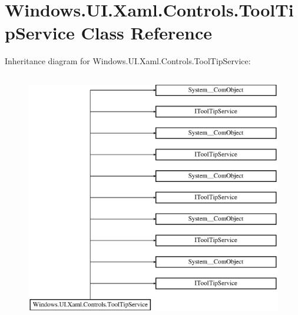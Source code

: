 \hypertarget{class_windows_1_1_u_i_1_1_xaml_1_1_controls_1_1_tool_tip_service}{}\section{Windows.\+U\+I.\+Xaml.\+Controls.\+Tool\+Tip\+Service Class Reference}
\label{class_windows_1_1_u_i_1_1_xaml_1_1_controls_1_1_tool_tip_service}
Inheritance diagram for Windows.\+U\+I.\+Xaml.\+Controls.\+Tool\+Tip\+Service\+:\begin{figure}[H]
\begin{center}
\leavevmode
\includegraphics[height=11.000000cm]{class_windows_1_1_u_i_1_1_xaml_1_1_controls_1_1_tool_tip_service}
\end{center}
\end{figure}
